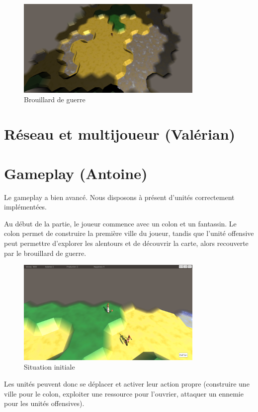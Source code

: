 \documentclass[12pt]{report}
\begin{document}
\begin{figure}[H]
    \centering
    \includegraphics[width=0.8\textwidth]{FogOfWar}
    \caption{Brouillard de guerre}
\end{figure}

\section{Réseau et multijoueur (Valérian)}

\section{Gameplay (Antoine)}

Le gameplay a bien avancé. Nous disposons à présent d’unités correctement
implémentées.

Au début de la partie, le joueur commence avec un colon et un fantassin. Le
colon permet de construire la première ville du joueur, tandis que l’unité
offensive peut permettre d’explorer les alentours et de découvrir la carte,
alors recouverte par le brouillard de guerre. 

\begin{figure}[H]
    \centering
    \includegraphics[width=0.8\textwidth]{InitialSituation}
    \caption{Situation initiale}
\end{figure}

Les unités peuvent donc se déplacer et activer leur action propre (construire
une ville pour le colon, exploiter une ressource pour l'ouvrier, attaquer un 
ennemie pour les unités offensives).
\end{document}
